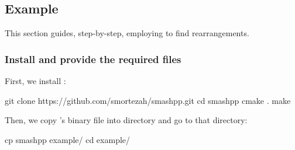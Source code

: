 



\subsection{Example}
This section guides, step-by-step, employing \smashpp to find rearrangements.

\subsubsection*{Install \smashpp and provide the required files}
First, we install \smashpp:
\begin{code}[style=bash]
git clone https://github.com/smortezah/smashpp.git
cd smashpp
cmake .
make
\end{code}
Then, we copy \smashpp's binary file into  directory and go to that directory:
\begin{code}[style=bash]
cp smashpp example/
cd example/
\end{code}




